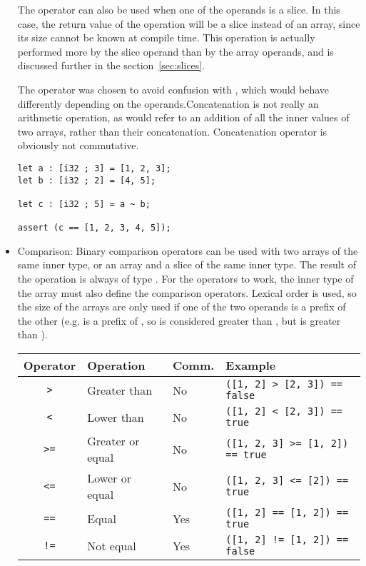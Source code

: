 \begin{itemize}
  The operator can also be used when one of the operands is a slice. In this
  case, the return value of the operation will be a slice instead of an array,
  since its size cannot be known at compile time. This operation is actually
  performed more by the slice operand than by the array operands, and is
  discussed further in the section~\ref{sec:slices}.

  The operator \token{\~} was chosen to avoid confusion with \token{+}, which
  would behave differently depending on the operands.Concatenation is not really
  an arithmetic operation, as \token{+} would refer to an addition of all the
  inner values of two arrays, rather than their concatenation. Concatenation
  operator is obviously not commutative.

  \begin{lstlisting}[style=coloredverbatim]
let a : [i32 ; 3] = [1, 2, 3];
let b : [i32 ; 2] = [4, 5];

let c : [i32 ; 5] = a ~ b;

assert (c == [1, 2, 3, 4, 5]);
  \end{lstlisting}

\item Comparison: Binary comparison operators can be used with two arrays of the
  same inner type, or an array and a slice of the same inner type. The result of
  the operation is always of type . For the operators to work, the
  inner type of the array must also define the comparison operators. Lexical
  order is used, so the size of the arrays are only used if one of the two operands
  is a prefix of the other (e.g. \token{[1, 2]} is a prefix of \token{[1, 2,
      3]}, so \token{[1, 2, 3]} is considered greater than \token{[1, 2]}, but
  \token{[1, 3]} is greater than \token{[1, 2, 3]}).

  \begin{center}\begin{adjustbox}{max width=1.0\linewidth}
    \begin{tabular}{|c|lll|}
      \hline
      Operator & Operation & Comm. & Example\\
      \hline
      \hline
      \texttt{>}      & Greater than     & No          & \texttt{([1, 2] > [2, 3]) == false}    \\
      \texttt{<}      & Lower than       & No          & \texttt{([1, 2] < [2, 3]) == true}     \\
      \texttt{>=}     & Greater or equal & No          & \texttt{([1, 2, 3] >= [1, 2]) == true} \\
      \texttt{<=}     & Lower or equal   & No          & \texttt{([1, 2, 3] <= [2]) == true}    \\
      \texttt{==}     & Equal            & Yes         & \texttt{([1, 2] == [1, 2]) == true}    \\
      \texttt{!=}     & Not equal        & Yes         & \texttt{([1, 2] != [1, 2]) == false}   \\
      \hline
    \end{tabular}
  \end{adjustbox}\end{center}


\end{itemize}
